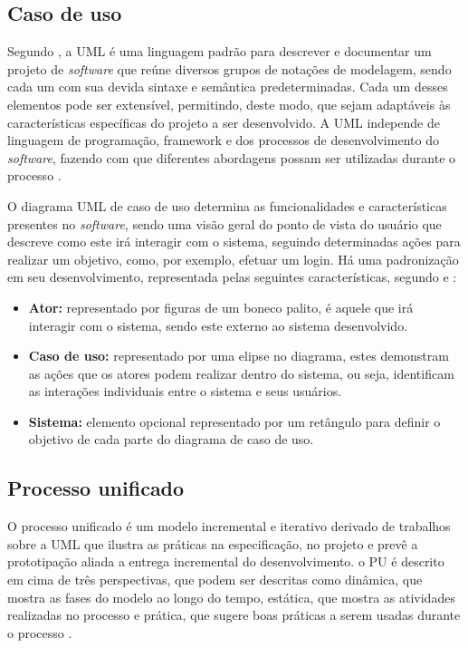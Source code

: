 \subsection{Caso de uso}
Segundo , a UML é uma linguagem padrão para descrever e documentar um projeto de \textit{software} que reúne diversos grupos de notações de modelagem, sendo cada um com sua devida sintaxe e semântica predeterminadas. Cada um desses elementos pode ser extensível, permitindo, deste modo, que sejam adaptáveis às características específicas do projeto a ser desenvolvido. A UML independe de linguagem de programação, framework e dos processos de desenvolvimento do \textit{software}, fazendo com que diferentes abordagens possam ser utilizadas durante o processo \cite{BEZERRA}.

O diagrama UML de caso de uso determina as funcionalidades e características presentes no \textit{software}, sendo uma visão geral do ponto de vista do usuário que descreve como este irá interagir com o sistema, seguindo determinadas ações para realizar um objetivo, como, por exemplo, efetuar um login. Há uma padronização em seu desenvolvimento, representada pelas seguintes características, segundo  e :
\begin{itemize}
    \item \textbf{Ator: }representado por figuras de um boneco palito, é aquele que irá interagir com o sistema, sendo este externo ao sistema desenvolvido.
    \item \textbf{Caso de uso: }representado por uma elipse no diagrama, estes demonstram as ações que os atores podem realizar dentro do sistema, ou seja, identificam as interações individuais entre o sistema e seus usuários. 
    \item \textbf{Sistema: }elemento opcional representado por um retângulo para definir o objetivo de cada parte do diagrama de caso de uso. 
\end{itemize}

\subsection{Processo unificado}
O processo unificado é um modelo incremental e iterativo derivado de trabalhos sobre a UML que ilustra as práticas na especificação, no projeto e prevê a prototipação aliada a entrega incremental do desenvolvimento. o PU é descrito em cima de três perspectivas, que podem ser descritas como dinâmica, que mostra as fases do modelo ao longo do tempo, estática, que mostra as atividades realizadas no processo e prática, que sugere boas práticas a serem usadas durante o processo \cite{SOMMERVILE}.

